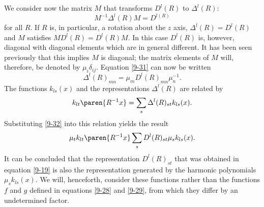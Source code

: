 We consider now the matrix $M$ that transforms $D^{l}(R)$ to $\Delta^{l}(R)$:
  \begin{equation}
    M^{-1} \Delta^{l}(R)M = D^{l(R)}
  \label{9-31}
  \end{equation}
for all $R$. If $R$ is, in particular, a rotation about the $z$ axis, $\Delta^{l}(R) = D^{l}(R)$ and $M$ satisfies $M D^{l}(R) = D^{l}(R) M$. In this case $D^{l}(R)$ is, however, diagonal with diagonal elements which are in general different. It has been seen previously that this implies $M$ is diagonal; the matrix elements of $M$ will, therefore, be denoted by $\mu_{i}\delta_{ij}$. Equation \eqref{9-31} can now be written
  \begin{equation}
    \Delta^{l}(R)_{mn} = \mu_{m} D^{l}(R)_{mn} \mu_{n}^{-1} .
  \label{9-32}
  \end{equation}
The functions $k_{ls}(x)$ and the representations $\Delta^{l}(R)$ are related by
  \begin{equation*}
    k_{lt}\paren{R^{-1}x} = \sum_{s}\Delta^{l}(R)_{st}k_{ls}(x) .
  \end{equation*}
Substituting \eqref{9-32} into this relation yields the result
  \begin{equation}
    \mu_{t} k_{lt} \paren{R^{-1}x}\sum_{s} D^{l}(R)_{st} \mu_{s} k_{ls}(x) .
  \label{9-33}
  \end{equation}
It can be concluded that the representation $D^{l}(R)_{st}$ that was obtained in equation \eqref{9-19} is also the representation generated by the harmonic polynomials $\mu_{s} k_{ls}(x)$. We will, henceforth, consider these functions rather than the functions $f$ and $g$ defined in equations \eqref{9-28} and \eqref{9-29},
from which they differ by an undetermined factor.

